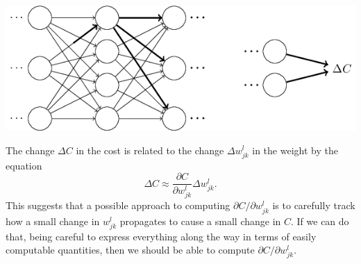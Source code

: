 \documentclass[a4paper,twoside,10pt]{book}
\begin{document}
\begin{center}
	\includegraphics[scale=0.5]{./figures/ch2/tikz25}
\end{center}
The change $\Delta{}C$ in the cost is related to the change $\Delta{}w^l_{jk}$ in the weight by the equation
\begin{equation}
	\Delta C \approx \frac{\partial C}{\partial w^l_{jk}} \Delta w^l_{jk}.
	\tag{47}\label{eq:47}
\end{equation}
This suggests that a possible approach to computing $\partial{}C/\partial{}w^l_{jk}$ is to carefully track how a small change in $w^l_{jk}$ propagates to cause a small change in $C$. If we can do that, being careful to express everything along the way in terms of easily computable quantities, then we should be able to compute $\partial{}C/\partial{}w^l_{jk}$.
\end{document}
